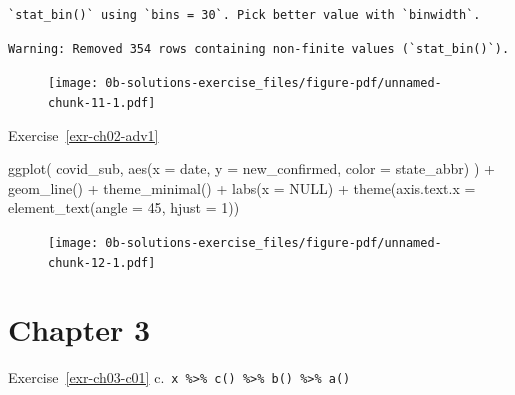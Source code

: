 \documentclass[
  letterpaper,
  DIV=11,
  numbers=noendperiod]{scrreprt}
\newenvironment{Shaded}{\begin{snugshade}}{\end{snugshade}}
\newcommand{\AttributeTok}[1]{\textcolor[rgb]{0.40,0.45,0.13}{#1}}
\newcommand{\ConstantTok}[1]{\textcolor[rgb]{0.56,0.35,0.01}{#1}}
\newcommand{\DecValTok}[1]{\textcolor[rgb]{0.68,0.00,0.00}{#1}}
\newcommand{\FunctionTok}[1]{\textcolor[rgb]{0.28,0.35,0.67}{#1}}
\newcommand{\NormalTok}[1]{\textcolor[rgb]{0.00,0.23,0.31}{#1}}
\newcommand{\SpecialCharTok}[1]{\textcolor[rgb]{0.37,0.37,0.37}{#1}}
\theoremstyle{definition}
\theoremstyle{remark}
\begin{document}
\begin{verbatim}
`stat_bin()` using `bins = 30`. Pick better value with `binwidth`.
\end{verbatim}

\begin{verbatim}
Warning: Removed 354 rows containing non-finite values (`stat_bin()`).
\end{verbatim}

\begin{figure}[H]

{\centering \texttt{[image: 0b-solutions-exercise\_files/figure-pdf/unnamed-chunk-11-1.pdf]}

}

\end{figure}

Exercise~\ref{exr-ch02-adv1}

\begin{Shaded}
\begin{Highlighting}[]
\FunctionTok{ggplot}\NormalTok{(}
\NormalTok{  covid\_sub, }
  \FunctionTok{aes}\NormalTok{(}\AttributeTok{x =}\NormalTok{ date, }\AttributeTok{y =}\NormalTok{ new\_confirmed, }\AttributeTok{color =}\NormalTok{ state\_abbr)}
\NormalTok{  ) }\SpecialCharTok{+}
  \FunctionTok{geom\_line}\NormalTok{() }\SpecialCharTok{+}
  \FunctionTok{theme\_minimal}\NormalTok{() }\SpecialCharTok{+}
  \FunctionTok{labs}\NormalTok{(}\AttributeTok{x =} \ConstantTok{NULL}\NormalTok{) }\SpecialCharTok{+}
  \FunctionTok{theme}\NormalTok{(}\AttributeTok{axis.text.x =} \FunctionTok{element\_text}\NormalTok{(}\AttributeTok{angle =} \DecValTok{45}\NormalTok{, }\AttributeTok{hjust =} \DecValTok{1}\NormalTok{))}
\end{Highlighting}
\end{Shaded}

\begin{figure}[H]

{\centering \texttt{[image: 0b-solutions-exercise\_files/figure-pdf/unnamed-chunk-12-1.pdf]}

}

\end{figure}

\hypertarget{sec-ex03-sol}{%
\section{Chapter 3}\label{sec-ex03-sol}}

Exercise~\ref{exr-ch03-c01}
c.~\texttt{x\ \%\textgreater{}\%\ c()\ \%\textgreater{}\%\ b()\ \%\textgreater{}\%\ a()}
\end{document}
